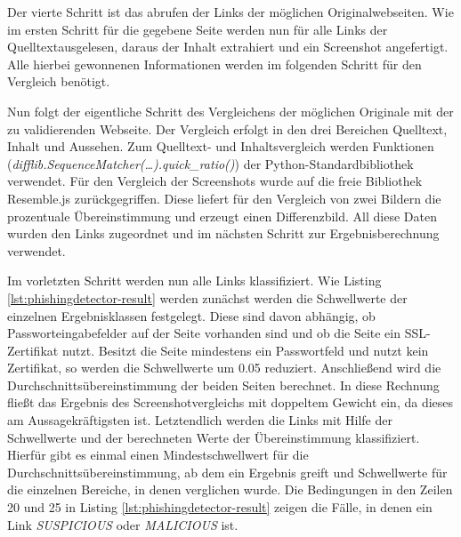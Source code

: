 Der vierte Schritt ist das abrufen der Links der möglichen Originalwebseiten. Wie im ersten Schritt für die gegebene Seite werden nun für alle Links der Quelltextausgelesen, daraus der Inhalt extrahiert und ein Screenshot angefertigt. Alle hierbei gewonnenen Informationen werden im folgenden Schritt für den Vergleich benötigt.

Nun folgt der eigentliche Schritt des Vergleichens der möglichen Originale mit der zu validierenden Webseite. Der Vergleich erfolgt in den drei Bereichen Quelltext, Inhalt und Aussehen. Zum Quelltext- und Inhaltsvergleich werden Funktionen (\textit{difflib.SequenceMatcher(\ldots).quick\_ratio()}) der Python-Standardbibliothek verwendet. Für den Vergleich der Screenshots wurde auf die freie Bibliothek Resemble.js zurückgegriffen. Diese liefert für den Vergleich von zwei Bildern die prozentuale Übereinstimmung und erzeugt einen Differenzbild. All diese Daten wurden den Links zugeordnet und im nächsten Schritt zur Ergebnisberechnung verwendet.

Im vorletzten Schritt werden nun alle Links klassifiziert. Wie Listing \ref{lst:phishingdetector-result} werden zunächst werden die Schwellwerte der einzelnen Ergebnisklassen festgelegt. Diese sind davon abhängig, ob Passworteingabefelder auf der Seite vorhanden sind und ob die Seite ein SSL-Zertifikat nutzt. Besitzt die Seite mindestens ein Passwortfeld und nutzt kein Zertifikat, so werden die Schwellwerte um 0.05 reduziert. Anschließend wird die Durchschnittsübereinstimmung der beiden Seiten berechnet. In diese Rechnung fließt das Ergebnis des Screenshotvergleichs mit doppeltem Gewicht ein, da dieses am Aussagekräftigsten ist. Letztendlich werden die Links mit Hilfe der Schwellwerte und der berechneten Werte der Übereinstimmung klassifiziert. Hierfür gibt es einmal einen Mindestschwellwert für die Durchschnittsübereinstimmung, ab dem ein Ergebnis greift und Schwellwerte für die einzelnen Bereiche, in denen verglichen wurde. Die Bedingungen in den Zeilen 20 und 25 in Listing \ref{lst:phishingdetector-result} zeigen die Fälle, in denen ein Link \textit{SUSPICIOUS} oder \textit{MALICIOUS} ist.

